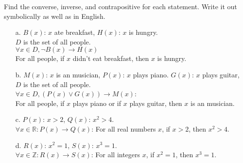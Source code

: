     \begin{questionNOGRADE}{\thequestion}
        Find the converse, inverse, and contrapositive for each statement.
        Write it out symbolically as well as in English.
        
        \begin{enumerate}
            \item[a.] $B(x)$: $x$ ate breakfast, $H(x)$: $x$ is hungry. \\
                $D$ is the set of all people. \\
                $\forall x \in D, \neg B(x) \to H(x)$ \\
                For all people, if $x$ didn't eat breakfast, then $x$ is hungry.
            \item[b.] $M(x)$: $x$ is an musician, $P(x)$: $x$ plays piano. $G(x)$: $x$ plays guitar, \\
                $D$ is the set of all people. \\
                $\forall x \in D, (P(x) \lor G(x)) \to M(x)$: \\
                For all people, if $x$ plays piano or if $x$ plays guitar, then $x$ is an musician.
            \item[c.] $P(x)$: $x > 2$, $Q(x)$: $x^{2}  > 4$. \\
                $\forall x \in \mathbb{R}: P(x) \to Q(x)$:
                For all real numbers $x$, if $x > 2$, then $x^{2} > 4$.
            \item[d.] $R(x)$: $x^{2} = 1$, $S(x)$: $x^{3} = 1$. \\
                $\forall x \in \mathbb{Z}: R(x) \to S(x)$:
                For all integers $x$, if $x^{2} = 1$, then $x^{3} = 1$.
        \end{enumerate}        
    \end{questionNOGRADE}



